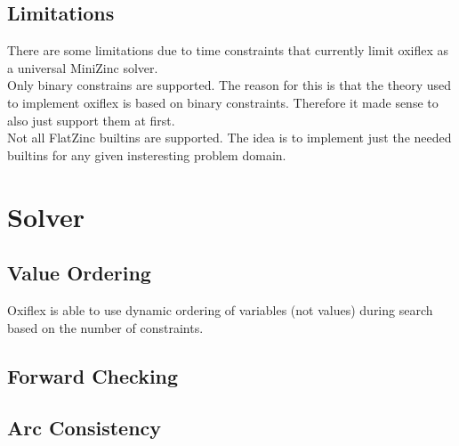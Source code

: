 \subsection{Limitations}

There are some limitations due to time constraints that currently limit oxiflex as a universal MiniZinc solver. \\

Only binary constrains are supported. The reason for this is that the theory used to implement oxiflex is based on binary constraints. Therefore it made sense to also just support them at first. \\

Not all FlatZinc builtins are supported. The idea is to implement just the needed builtins for any given insteresting problem domain.

\section{Solver}

\subsection{Value Ordering}

Oxiflex is able to use dynamic ordering of variables (not values) during search based on the number of constraints.

\subsection{Forward Checking}

\subsection{Arc Consistency}


